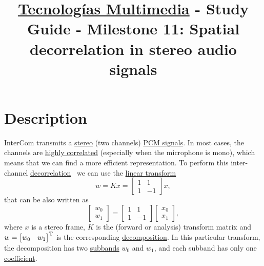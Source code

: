\title{\href{https://www.ual.es/estudios/grados/presentacion/plandeestudios/asignatura/4015/40154321?idioma=zh_CN}{Tecnologías Multimedia} - Study Guide - Milestone 11: Spatial decorrelation in stereo audio signals}

\maketitle

\section{Description}

InterCom transmits a
\href{https://en.wikipedia.org/wiki/Stereophonic_sound}{stereo} (two
channels)
\href{https://en.wikipedia.org/wiki/Pulse-code_modulation}{PCM
  signals}. In most cases, the channels are
\href{https://en.wikipedia.org/wiki/Binaural_recording}{highly
  correlated} (especially when the microphone is mono), which means
that we can find a more efficient representation. To perform this
inter-channel
\href{https://en.wikipedia.org/wiki/Decorrelation}{decorrelation}~\cite{thinkstats}
we can use the \href{https://en.wikipedia.org/wiki/Linear_map}{linear
  transform}~\cite{strang4linear}
\begin{equation}
  w = Kx = \begin{bmatrix} 1 & 1 \\ 1 & -1 \end{bmatrix}x,
  \label{eq:forward_transform_matrix_form}
\end{equation}
that can be also written as
\begin{equation}
  \begin{bmatrix}
    w_0 \\
    w_1
  \end{bmatrix}
  = 
  \begin{bmatrix} 1 & 1 \\ 1 & -1 \end{bmatrix}
  \begin{bmatrix}
    x_0 \\
    x_1
  \end{bmatrix},
  \label{eq:forward_transform_matrix_form2}
\end{equation}
where $x$ is a stereo frame, $K$ is the (forward or analysis)
transform matrix and $w=\begin{bmatrix} w_0 & w_1\end{bmatrix}^{\text
  T}$ is the corresponding
\href{https://en.wikipedia.org/wiki/Discrete_wavelet_transform#Example_in_image_processing}{decomposition}. In
this particular transform, the decomposition has two
\href{https://en.wikipedia.org/wiki/Sub-band_coding}{subbands} $w_0$
and $w_1$, and each subband has only one
\href{https://web.stanford.edu/class/ee398a/handouts/lectures/07-TransformCoding.pdf}{coefficient}.

